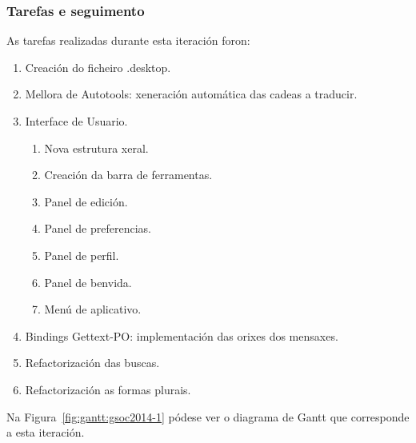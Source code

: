 \subsubsection{Tarefas e seguimento}

As tarefas realizadas durante esta iteración foron:

\begin{enumerate}[label=\bfseries WBS 1.\arabic*]
  \item Creación do ficheiro .desktop.
  \item Mellora de Autotools: xeneración automática das cadeas a traducir.
  \item Interface de Usuario.
    \begin{enumerate}[label=\bfseries WBS 1.3.\arabic*]
      \item Nova estrutura xeral.
      \item Creación da barra de ferramentas.
      \item Panel de edición.
      \item Panel de preferencias.
      \item Panel de perfil.
      \item Panel de benvida.
      \item Menú de aplicativo.
    \end{enumerate}
  \item Bindings Gettext-PO: implementación das orixes dos mensaxes.
  \item Refactorización das buscas.
  \item Refactorización as formas plurais.
\end{enumerate}

Na Figura~\ref{fig:gantt:gsoc2014-1} pódese ver o diagrama de Gantt que corresponde a esta iteración.

